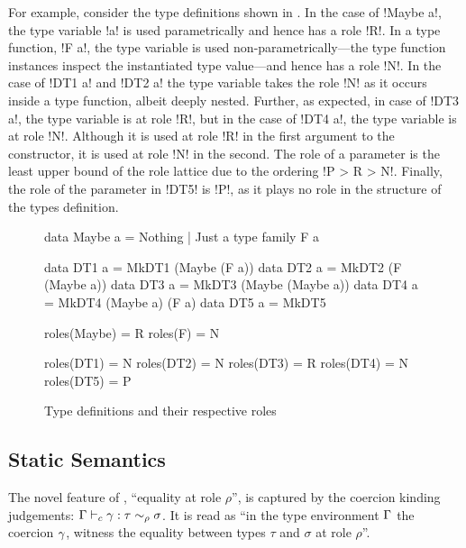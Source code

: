 \documentclass[screen,nonacm,manuscript,review]{acmart} %
\begin{document}
For example, consider the type definitions shown in .
In the case of !Maybe a!, the type variable !a! is used parametrically and hence has a role !R!.
In a type function, !F a!, the type variable is used non-parametrically---the type function instances inspect
the instantiated type value---and hence has a role !N!. In the case of !DT1 a! and !DT2 a! the type variable
takes the role !N! as it occurs inside a type function, albeit deeply nested. Further, as expected,
in case of !DT3 a!, the type variable is at role !R!, but in the case of !DT4 a!, the type variable is
at role !N!. Although it is used at role !R! in the first argument to the constructor, it is used at
role !N! in the second. The role of a parameter is the least upper bound
of the role lattice due to the ordering !P > R > N!. Finally, the role of the parameter
in !DT5! is !P!, as it plays no role in the structure of the types definition.
\begin{figure}[h]
\begin{minipage}{0.5\linewidth}
\begin{CenteredBox}
\begin{code}
data Maybe a = Nothing | Just a
type family F a

data DT1 a = MkDT1 (Maybe (F a))
data DT2 a = MkDT2 (F (Maybe a))
data DT3 a = MkDT3 (Maybe (Maybe a))
data DT4 a = MkDT4 (Maybe a) (F a)
data DT5 a = MkDT5
\end{code}
\end{CenteredBox}
\end{minipage}%
\begin{minipage}{0.5\linewidth}
\begin{CenteredBox}
\begin{code}
roles(Maybe) = { R }
roles(F)     = { N }

roles(DT1) = { N }
roles(DT2) = { N }
roles(DT3) = { R }
roles(DT4) = { N }
roles(DT5) = { P }
\end{code}
\end{CenteredBox}
\end{minipage}
\caption{Type definitions and their respective roles}
\label{fig:datatype-roles}
\end{figure}



\subsection{Static Semantics}\label{sec:sfr-static-sem}
The novel feature of \SFR, ``equality at role $\rho$'', is captured by
the coercion kinding judgements: $\Gamma \vdash_{c} \gamma : \tau\sim_\rho\sigma$.
It is read as ``in the type environment $\Gamma$
the coercion $\gamma$, witness the equality between types $\tau$
and $\sigma$ at role $\rho$''.
\end{document}
